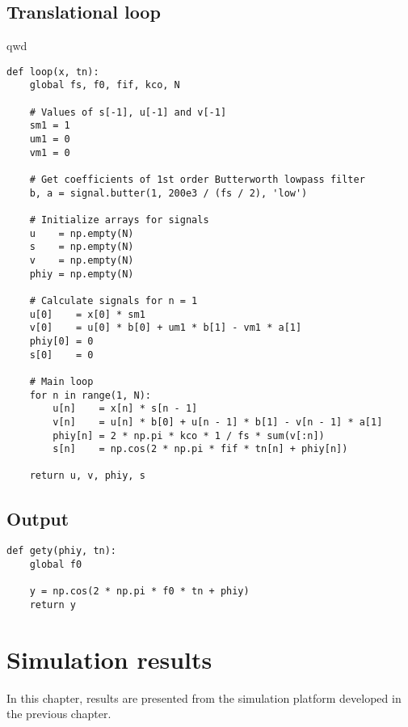 \section{Translational loop}
qwd

\lstset{language=python,caption=The translational loop,label=code:loop}
\begin{lstlisting}
def loop(x, tn):
    global fs, f0, fif, kco, N

    # Values of s[-1], u[-1] and v[-1]
    sm1 = 1
    um1 = 0
    vm1 = 0

    # Get coefficients of 1st order Butterworth lowpass filter
    b, a = signal.butter(1, 200e3 / (fs / 2), 'low')

    # Initialize arrays for signals
    u    = np.empty(N)
    s    = np.empty(N)
    v    = np.empty(N)
    phiy = np.empty(N)

    # Calculate signals for n = 1
    u[0]    = x[0] * sm1
    v[0]    = u[0] * b[0] + um1 * b[1] - vm1 * a[1]
    phiy[0] = 0
    s[0]    = 0

    # Main loop
    for n in range(1, N):
        u[n]    = x[n] * s[n - 1]
        v[n]    = u[n] * b[0] + u[n - 1] * b[1] - v[n - 1] * a[1]
        phiy[n] = 2 * np.pi * kco * 1 / fs * sum(v[:n])
        s[n]    = np.cos(2 * np.pi * fif * tn[n] + phiy[n])

    return u, v, phiy, s
\end{lstlisting}


\section{Output}
\lstset{language=python,caption=Generating the output,label=code:output}
\begin{lstlisting}
def gety(phiy, tn):
    global f0

    y = np.cos(2 * np.pi * f0 * tn + phiy)
    return y
\end{lstlisting}

\chapter{Simulation results} \label{ch:intro}
In this chapter, results are presented from the simulation platform developed in the previous chapter.















